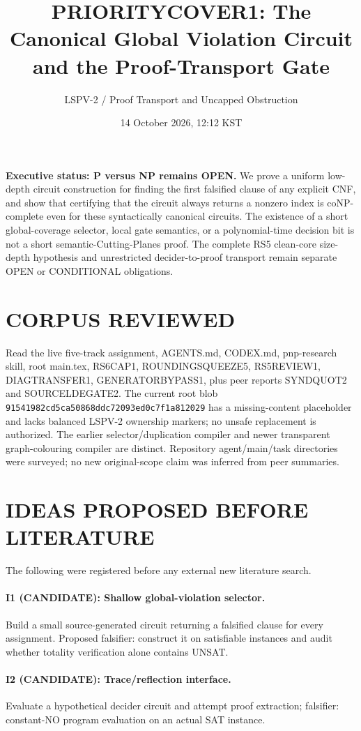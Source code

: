 \documentclass[11pt]{article}
\title{PRIORITYCOVER1: The Canonical Global Violation Circuit and the Proof-Transport Gate}
\author{LSPV-2 / Proof Transport and Uncapped Obstruction}
\date{14 October 2026, 12:12 KST}
\begin{document}
\maketitle
\noindent\textbf{Executive status: P versus NP remains OPEN.}
We prove a uniform low-depth circuit construction for finding the first
falsified clause of any explicit CNF, and show that certifying that
the circuit always returns a nonzero index is coNP-complete even
for these syntactically canonical circuits. The existence of a short
global-coverage selector, local gate semantics, or a polynomial-time
decision bit is not a short semantic-Cutting-Planes proof. The complete
RS5 clean-core size-depth hypothesis and unrestricted decider-to-proof
transport remain separate OPEN or CONDITIONAL obligations.

\section{CORPUS REVIEWED}
Read the live five-track assignment, AGENTS.md, CODEX.md, pnp-research
skill, root main.tex, RS6CAP1, ROUNDINGSQUEEZE5, RS5REVIEW1,
DIAGTRANSFER1, GENERATORBYPASS1, plus peer reports SYNDQUOT2 and
SOURCELDEGATE2. The current root blob
\texttt{91541982cd5ca50868ddc72093ed0c7f1a812029}
has a missing-content placeholder and lacks balanced LSPV-2 ownership
markers; no unsafe replacement is authorized. The earlier
selector/duplication compiler and newer transparent graph-colouring
compiler are distinct. Repository agent/main/task directories were surveyed;
no new original-scope claim was inferred from peer summaries.

\section{IDEAS PROPOSED BEFORE LITERATURE}
The following were registered before any external new literature search.
\paragraph{I1 (CANDIDATE): Shallow global-violation selector.}
Build a small source-generated circuit returning a falsified clause
for every assignment. Proposed falsifier: construct it on satisfiable
instances and audit whether totality verification alone contains UNSAT.
\paragraph{I2 (CANDIDATE): Trace/reflection interface.}
Evaluate a hypothetical decider circuit and attempt proof extraction;
falsifier: constant-NO program evaluation on an actual SAT instance.
\end{document}
